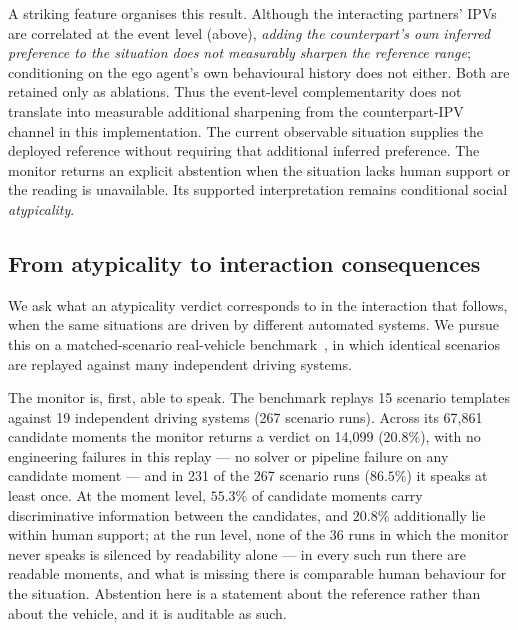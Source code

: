 \documentclass[12pt,a4paper]{article}
\begin{document}
A striking feature organises this result. Although the interacting partners' IPVs are correlated at
the event level (above), \emph{adding the counterpart's own inferred preference to the
situation does not measurably sharpen the reference range}; conditioning on the ego agent's own
behavioural history does not either. Both are retained only as ablations. Thus the event-level
complementarity does not translate into measurable additional sharpening from the counterpart-IPV
channel in this implementation. The current observable situation supplies the deployed reference
without requiring that additional inferred preference. The monitor returns an explicit abstention
when the situation lacks human support or the reading is unavailable. Its supported interpretation
remains conditional social \emph{atypicality}.

\subsection{From atypicality to interaction consequences}
We ask what an atypicality verdict corresponds to in the interaction that follows, when
the same situations are driven by different automated systems. We pursue this on a matched-scenario
real-vehicle benchmark~\cite{onsite}, in which identical scenarios are replayed against many
independent driving systems.

The monitor is, first, able to speak. The benchmark replays 15 scenario templates against 19
independent driving systems (267 scenario runs). Across its 67{,}861 candidate moments the monitor
returns a verdict on 14{,}099 ($20.8\%$), with no engineering failures in this replay --- no solver or pipeline failure on any
candidate moment --- and in 231 of the 267 scenario runs ($86.5\%$) it speaks at least once. At the
moment level, $55.3\%$ of candidate moments carry discriminative information between the candidates,
and $20.8\%$ additionally lie within human support; at the run level, none of the 36 runs in which the
monitor never speaks is silenced by readability alone --- in every such run there are readable
moments, and what is missing there is comparable human behaviour for the situation. Abstention here
is a statement about the reference rather than about the vehicle, and it is auditable as such.
\end{document}
